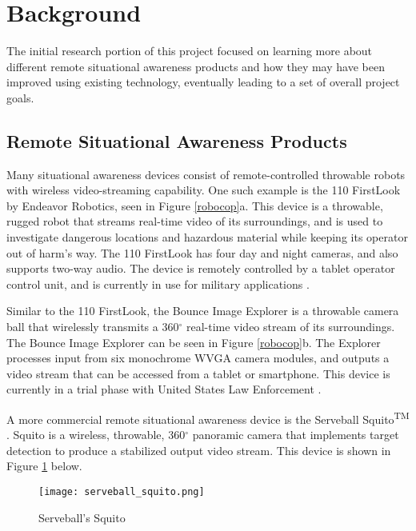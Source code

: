 \section{Background}
The initial research portion of this project focused on learning more about different remote situational awareness products and how they may have been improved using existing technology, eventually leading to a set of overall project goals.

\subsection{Remote Situational Awareness Products}
Many situational awareness devices consist of remote-controlled throwable robots with wireless video-streaming capability. One such example is the 110 FirstLook by Endeavor Robotics, seen in Figure \ref{robocop}a. This device is a throwable, rugged robot that streams real-time video of its surroundings, and is used to investigate dangerous locations and hazardous material while keeping its operator out of harm's way. The 110 FirstLook has four day and night cameras, and also supports two-way audio. The device is remotely controlled by a tablet operator control unit, and is currently in use for military applications \cite{endeavor}.
\par
Similar to the 110 FirstLook, the Bounce Image Explorer is a throwable camera ball that wirelessly transmits a 360$^\circ$ real-time video stream of its surroundings. The Bounce Image Explorer can be seen in Figure \ref{robocop}b. The Explorer processes input from six monochrome WVGA camera modules, and outputs a video stream that can be accessed from a tablet or smartphone. This device is currently in a trial phase with United States Law Enforcement \cite{bounceImaging}. 
\par
A more commercial remote situational awareness device is the Serveball Squito\textsuperscript{TM} \cite{serveball}. Squito is a wireless, throwable, 360$^{\circ}$ panoramic camera that implements target detection to produce a stabilized output video stream. This device is shown in Figure \ref{squito} below.

\begin{figure}[H]
	\centerline{\texttt{[image: serveball\_squito.png]}}
	\caption{Serveball's Squito \cite{serveball}}
	\label{squito}
\end{figure}

